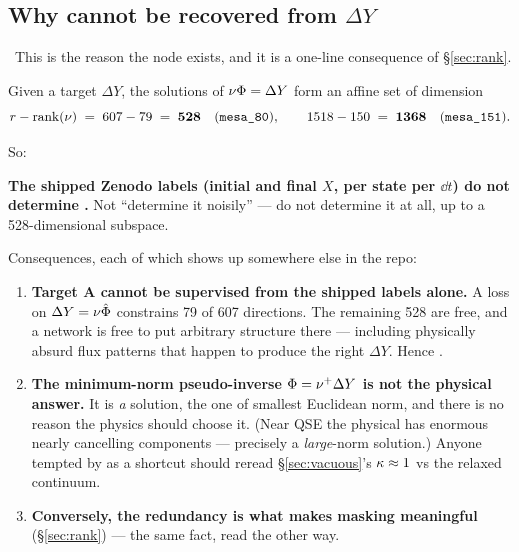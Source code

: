\subsection{Why \texorpdfstring{\Phifl}{Phi} cannot be recovered from
            \texorpdfstring{$\Delta Y$}{dY}}
\label{sec:phinotrecoverable}

\begin{warn}
\warnglyph{}~This is the reason the node exists, and it is a one-line consequence
of \S\ref{sec:rank}.
\end{warn}

Given a target $\Delta Y$, the solutions of $\nu\Phi = \Delta Y$ form an
affine set of dimension
%
\begin{equation}
r - \operatorname{rank}(\nu) \;=\; 607 - 79 \;=\; \mathbf{528}\quad(\texttt{mesa\_80}),
\qquad 1518 - 150 \;=\; \mathbf{1368}\quad(\texttt{mesa\_151}).
\label{eq:fibredim}
\end{equation}

So:

\begin{result}
\textbf{The shipped Zenodo labels (initial and final $X$, per state per
$\dd t$) do not determine \Phifl.} Not ``determine it noisily'' --- do not
determine it at all, up to a 528-dimensional subspace.
\end{result}

Consequences, each of which shows up somewhere else in the repo:

\begin{enumerate}
\item \textbf{Target A cannot be supervised from the shipped labels alone.} A
  loss on $\Delta Y = \nu\hat{\Phi}$ constrains 79 of 607 directions. The
  remaining 528 are free, and a network is free to put arbitrary structure there
  --- including physically absurd flux patterns that happen to produce the right
  $\Delta Y$. Hence .
\item \textbf{The minimum-norm pseudo-inverse $\Phi = \nu^{+}\Delta Y$ is not
  the physical answer.} It is \emph{a} solution, the one of smallest Euclidean
  norm, and there is no reason the physics should choose it. (Near QSE the
  physical \Phifl{} has enormous nearly cancelling components --- precisely a
  \emph{large}-norm solution.) Anyone tempted by  as a
  shortcut should reread \S\ref{sec:vacuous}'s $\kappa \approx 1$ vs the relaxed
  continuum.
\item \textbf{Conversely, the redundancy is what makes masking meaningful}
  (\S\ref{sec:rank}) --- the same fact, read the other way.
\end{enumerate}

